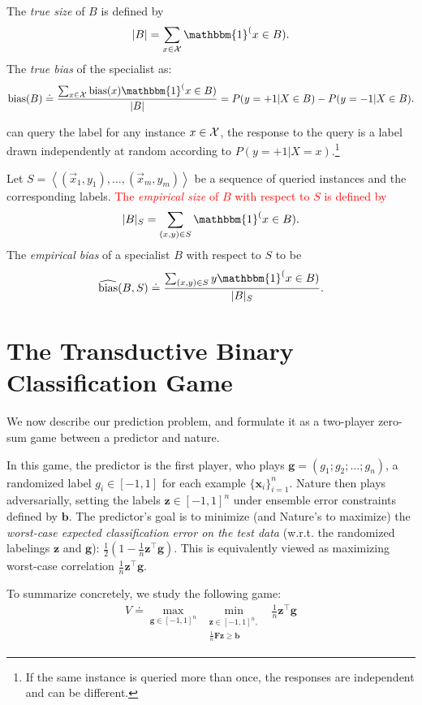 \documentclass{colt2015} %
\newcommand{\ones}[1]{\mathbbm{1}^{#1}}
\newcommand{\vF}{\mathbf{F}}
\newcommand{\vx}{\mathbf{x}}
\newcommand{\vb}{\mathbf{b}}
\newcommand{\vg}{\mathbf{g}}
\newcommand{\vz}{\mathbf{z}}
\newcommand{\new}[1]{\textcolor{red}{#1}}
\newcommand{\x}{\vec{x}}
\newcommand{\universe}[1]{{\cal #1}}
\newcommand{\samp}{S}
\newcommand{\bias}{\text{bias}}
\newcommand{\ebias}{\widehat{\text{bias}}}
\newcommand{\lrp}[1]{\left(#1\right)}
\renewcommand{\comment}[3]{\marginpar{\textcolor{#2}{#1: #3}}}
\newcommand{\shay}[1]{\comment{Shay}{red}{#1}}
\begin{document}
The {\em true size} of $B$ is defined by
\[\lvert B \rvert =  {\sum_{x \in \universe{X}} \ones(x \in B)}.\]
The {\em true bias} of the specialist as:
\[
\bias(B) \doteq
\frac{\sum_{x \in \universe{X}} \bias(x) \ones(x \in B)}
{\lvert B \rvert}
= P(y=+1 \vert X\in B) - P(y=-1 \vert X\in B).
\]

can query the label for any instance $x \in \universe{X}$, the
response to the query is a label drawn independently at random
according to $P(y=+1 | X=x)$.\footnote{If the same instance is queried
more than once, the responses are independent and can be different.}

Let $\samp= \left\langle (\x_1,y_1),\ldots,(\x_m,y_m) \right\rangle$ be a sequence
of queried instances and the corresponding labels. 
\new{The {\em empirical size} of $B$ with respect to $\samp$ is defined by
\[\lvert B \rvert_S =  {\sum_{(x,y) \in \samp} \ones(x \in B)}.\]}
\shay{The definition of $k(B)$ was missing. 
I added it and changed the notation from $k(B)$ to $\lvert B\rvert_S$.
If you agree then we should also change it in the simultaneous convergence proof.}
The {\em empirical bias} of a specialist $B$ with respect to $\samp$ to be 
\[
\ebias(B,\samp) \doteq
\frac{\sum_{(x,y) \in \samp} y \ones(x \in B)}{\lvert B\rvert_S}.
\]
\fi

\section{The Transductive Binary Classification Game}
\label{sec:game1}

We now describe our prediction problem, and formulate it as a
two-player zero-sum game between a predictor and nature.

In this game, the predictor is the first player, 
who plays $\vg = (g_1; g_2; \dots; g_n)$, 
a randomized label $g_i \in [-1,1]$ for each example $\{\vx_i\}_{i=1}^{n}$. 
Nature then plays adversarially, setting the labels $\vz \in [-1,1]^n$ 
under ensemble error constraints defined by $\vb$. 
The predictor's goal is to minimize (and Nature's to maximize) 
the \emph{worst-case expected classification error on the test data} 
(w.r.t. the randomized labelings $\vz$ and $\vg$): 
$\frac{1}{2} \lrp{1 - \frac{1}{n} \vz^\top \vg }$. 
This is equivalently viewed as maximizing worst-case correlation $\frac{1}{n} \vz^\top \vg $. 

To summarize concretely, we study the following game:
\begin{align}
\label{game1eq}
\displaystyle 
V\doteq\max_{\vg \in [-1,1]^n} \; \min_{\substack{ \vz \in [-1,1]^n , \\ \frac{1}{n} \vF \vz \geq \vb }} \;\; \frac{1}{n} \vz^\top \vg
\end{align}
\end{document}
